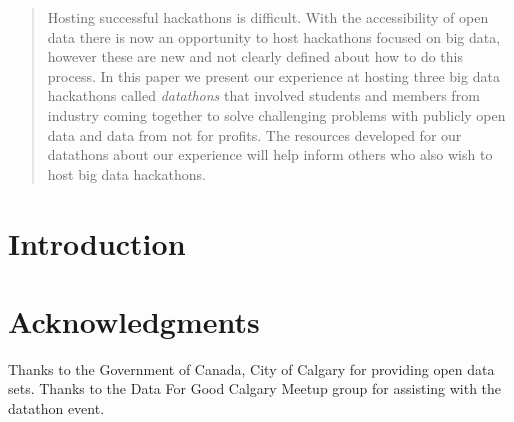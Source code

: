 \documentclass{sig-alternate-2013}
\begin{document}
\maketitle

\begin{abstract}
Hosting successful hackathons is difficult. With the accessibility of open data there is now an opportunity to host hackathons focused on big data, however these are new and not clearly defined about how to do this process. In this paper we present our experience at hosting three big data hackathons called \emph{datathons} that involved students and members from industry coming together to solve challenging problems with publicly open data and data from not for profits. The resources developed for our datathons about our experience will help inform others who also wish to host big data hackathons.
\end{abstract}





\section{Introduction}







\section*{Acknowledgments}
\small
Thanks to the Government of Canada, City of Calgary for providing open data sets. Thanks to the Data For Good Calgary Meetup group for assisting with the datathon event.


\small
%


\end{document}
